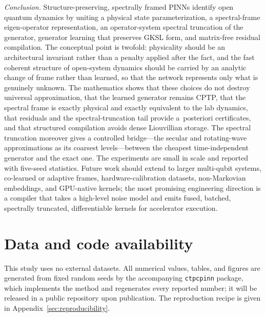 \documentclass[twocolumn,aps,prxquantum,superscriptaddress,nofootinbib,floatfix,longbibliography]{revtex4-2}
\begin{document}
\emph{Conclusion.} Structure-preserving, spectrally framed PINNs identify open quantum dynamics by uniting a physical state parameterization, a spectral-frame eigen-operator representation, an operator-system spectral truncation of the generator, generator learning that preserves GKSL form, and matrix-free residual compilation. The conceptual point is twofold: physicality should be an architectural invariant rather than a penalty applied after the fact, and the fast coherent structure of open-system dynamics should be carried by an analytic change of frame rather than learned, so that the network represents only what is genuinely unknown. The mathematics shows that these choices do not destroy universal approximation, that the learned generator remains CPTP, that the spectral frame is exactly physical and exactly equivalent to the lab dynamics, that residuals and the spectral-truncation tail provide a~posteriori certificates, and that structured compilation avoids dense Liouvillian storage. The spectral truncation moreover gives a controlled bridge---the secular and rotating-wave approximations as its coarsest levels---between the cheapest time-independent generator and the exact one. The experiments are small in scale and reported with five-seed statistics. Future work should extend to larger multi-qubit systems, co-learned or adaptive frames, hardware-calibration datasets, non-Markovian embeddings, and GPU-native kernels; the most promising engineering direction is a compiler that takes a high-level noise model and emits fused, batched, spectrally truncated, differentiable kernels for accelerator execution.


\section*{Data and code availability}
This study uses no external datasets. All numerical values, tables, and figures are generated from fixed random seeds by the accompanying \texttt{ctpcpinn} package, which implements the method and regenerates every reported number; it will be released in a public repository upon publication. The reproduction recipe is given in Appendix~\ref{sec:reproducibility}.

\appendix
\end{document}
